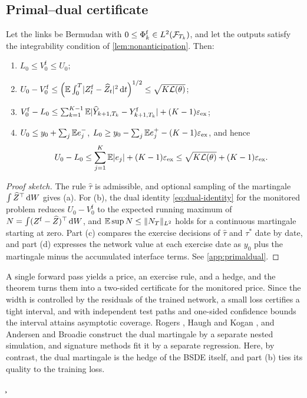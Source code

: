 \subsection{Primal--dual certificate}\label{sec:certificate}

\begin{theorem}\label{thm:primaldual}
Let the links be Bermudan with $0\le\Phi^{\mathrm f}_k\in L^2(\mathcal{F}_{T_k})$, and let the outputs satisfy the integrability condition of \cref{lem:nonanticipation}. Then:
\begin{enumerate}[label=(\alph*)]
\item $L_0\le V^{\mathrm f}_0\le U_0$;
\item $U_0-V^{\mathrm f}_0\le\left(\mathbb{E}\int_0^T\lvert Z^{\mathrm f}_t-\widehat Z_t\rvert^2\,\mathrm{d} t\right)^{1/2}\le\sqrt{K\mathcal{L}(\theta)}$;
\item $V^{\mathrm f}_0-L_0\le\sum_{k=1}^{K-1}\mathbb{E}\lvert \widehat Y_{k+1,T_k}-Y^{\mathrm f}_{k+1,T_k}\rvert+(K-1)\varepsilon_{\mathrm{ex}}$;
\item $U_0\le y_0+\sum_j\mathbb{E} e_j^-$, $L_0\ge y_0-\sum_j\mathbb{E} e_j^+-(K-1)\varepsilon_{\mathrm{ex}}$, and hence
\[
U_0-L_0\le\sum_{j=1}^K\mathbb{E}\lvert e_j\rvert+(K-1)\varepsilon_{\mathrm{ex}}\le\sqrt{K\mathcal{L}(\theta)}+(K-1)\varepsilon_{\mathrm{ex}} .
\]
\end{enumerate}
\end{theorem}

\begin{proof}[Proof sketch]
The rule $\hat\tau$ is admissible, and optional sampling of the martingale $\int\widehat Z^\top\,\mathrm{d} W$ gives (a). For (b), the dual identity \eqref{eq:dual-identity} for the monitored problem reduces $U_0-V^{\mathrm f}_0$ to the expected running maximum of $N=\int(Z^{\mathrm f}-\widehat Z)^\top\,\mathrm{d} W$, and $\mathbb{E}\sup N\le\lVert N_T\rVert_{L^2}$ holds for a continuous martingale starting at zero. Part (c) compares the exercise decisions of $\hat\tau$ and $\tau^*$ date by date, and part (d) expresses the network value at each exercise date as $y_0$ plus the martingale minus the accumulated interface terms. See \cref{app:primaldual}.
\end{proof}

\begin{remark}\label{rem:primaldual}
A single forward pass yields a price, an exercise rule, and a hedge, and the theorem turns them into a two-sided certificate for the monitored price. Since the width is controlled by the residuals of the trained network, a small loss certifies a tight interval, and with independent test paths and one-sided confidence bounds the interval attains asymptotic coverage. Rogers \cite{rogers2002}, Haugh and Kogan \cite{haugh2004}, and Andersen and Broadie \cite{andersen2004} construct the dual martingale by a separate nested simulation, and signature methods \cite{bayer2025primal} fit it by a separate regression. Here, by contrast, the dual martingale is the hedge of the BSDE itself, and part (b) ties its quality to the training loss.
\end{remark}
\c